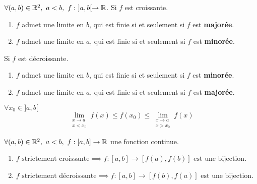 \begin{theorem}
	$\forall (a, b) \in \R^2,\ a < b,\ f : \ ]a, b[ \to \R$. 
	Si $f$ est croissante.
	\begin{enumerate}
		\item $f$ admet une limite en $b$, qui est finie si et seulement si $f$ est \textbf{majorée}.
		\item $f$ admet une limite en $a$, qui est finie si et seulement si $f$ est \textbf{minorée}.
	\end{enumerate}
	Si $f$ est décroissante.
	\begin{enumerate}
		\item $f$ admet une limite en $b$, qui est finie si et seulement si $f$ est \textbf{minorée}.
		\item $f$ admet une limite en $a$, qui est finie si et seulement si $f$ est \textbf{majorée}.
	\end{enumerate}
	$\forall x_0 \in ]a, b[$
	\[ \lim_{\substack{x \to a \\ x < x_0}} f(x) \leq f(x_0) \leq \lim_{\substack{x \to a \\ x > x_0}} f(x) \]
\end{theorem}

\begin{theorem}
	$\forall (a, b) \in \mathbb{R}^2,\ a < b,\ f : [a, b] \to \mathbb{R}$ une fonction continue.
	\begin{enumerate}
	    \item $ f \text{ strictement croissante} \implies f : [a, b] \to [f(a), f(b)] \text{ est une bijection} $.
            \item $ f \text{ strictement décroissante} \implies f : [a, b] \to [f(b), f(a)] \text{ est une bijection} $.
	\end{enumerate}
\end{theorem}